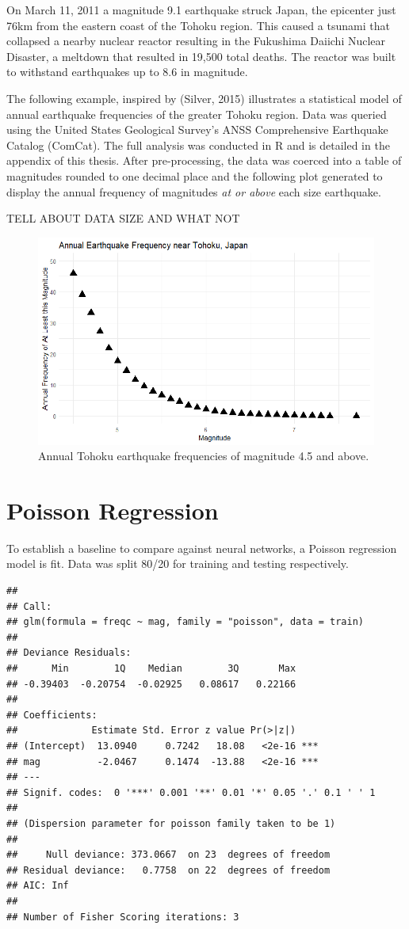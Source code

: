
On March 11, 2011 a magnitude 9.1 earthquake struck Japan, the epicenter just 76km from the eastern coast of the Tohoku region.  This caused a tsunami that collapsed a nearby nuclear reactor resulting in the Fukushima Daiichi Nuclear Disaster, a meltdown that resulted in 19,500 total deaths.  The reactor was built to withstand earthquakes up to 8.6 in magnitude.

The following example, inspired by (Silver, 2015)\cite{silver2015signal} illustrates a statistical model of annual earthquake frequencies of the greater Tohoku region.
Data was queried using the United States Geological Survey's ANSS Comprehensive Earthquake Catalog (ComCat).  The full analysis was conducted in R and is detailed in the appendix of this thesis.
After pre-processing, the data was coerced into a table of magnitudes rounded to one decimal place and the following plot generated to display the annual frequency of magnitudes \textit{at or above} each size earthquake.


TELL ABOUT DATA SIZE AND WHAT NOT

\begin{figure}[H]
    \center
    \includegraphics[width=0.75\linewidth]{Figures/tohoku_standardscale.png}
    \caption{\footnotesize{Annual Tohoku earthquake frequencies of magnitude 4.5 and above.}}
    \label{tohoku_unfit}
\end{figure}

\section{Poisson Regression}
To establish a baseline to compare against neural networks, a Poisson regression model is fit. Data was split 80/20 for training and testing respectively.  

\begin{verbatim}
## 
## Call:
## glm(formula = freqc ~ mag, family = "poisson", data = train)
## 
## Deviance Residuals: 
##      Min        1Q    Median        3Q       Max  
## -0.39403  -0.20754  -0.02925   0.08617   0.22166  
## 
## Coefficients:
##             Estimate Std. Error z value Pr(>|z|)    
## (Intercept)  13.0940     0.7242   18.08   <2e-16 ***
## mag          -2.0467     0.1474  -13.88   <2e-16 ***
## ---
## Signif. codes:  0 '***' 0.001 '**' 0.01 '*' 0.05 '.' 0.1 ' ' 1
## 
## (Dispersion parameter for poisson family taken to be 1)
## 
##     Null deviance: 373.0667  on 23  degrees of freedom
## Residual deviance:   0.7758  on 22  degrees of freedom
## AIC: Inf
## 
## Number of Fisher Scoring iterations: 3
\end{verbatim}


